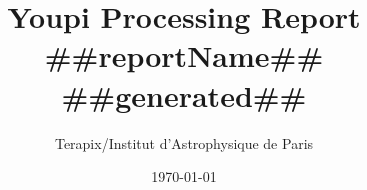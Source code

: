 \documentclass[11pt,titlepage]{article}
\begin{document}
\title{
\vspace{-3cm}
{\LARGE Youpi Processing Report}\\
{\Large ##reportName##}\\
{\small ##generated##}}
\date{\today\\\vspace{1cm}
}
\author{ \Large Terapix/Institut d'Astrophysique de Paris}
\maketitle
\newpage
\pagestyle{empty}
\setcounter{page}{0}
{\ }
\pagestyle{plain}
{}
\end{document}
